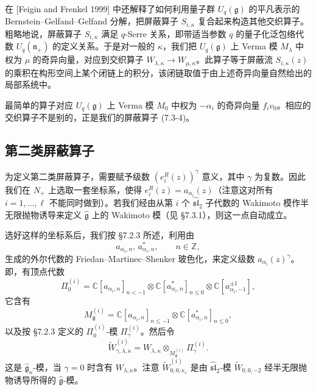 在 [Feigin and Frenkel 1999] 中还解释了如何利用量子群 $U_q(\mathfrak{g})$ 的平凡表示的 Bernstein--Gelfand--Gelfand 分解，把屏蔽算子 $S_{i,\kappa}$ 复合起来构造其他交织算子。粗略地说，屏蔽算子 $S_{i,\kappa}$ 满足 $q$-Serre 关系，即带适当参数 $q$ 的量子化泛包络代数 $U_q(\mathfrak{n}_+)$ 的定义关系。于是对一般的 $\kappa$，我们把 $U_q(\mathfrak{g})$ 上 Verma 模 $M_\lambda$ 中权为 $\mu$ 的奇异向量，对应到交织算子 $W_{\lambda,\kappa}\to W_{\mu,\kappa}$。此算子等于屏蔽流 $S_{i,\kappa}(z)$ 的乘积在构形空间上某个闭链上的积分，该闭链取值于由上述奇异向量自然给出的局部系统中。

最简单的算子对应 $U_q(\mathfrak{g})$ 上 Verma 模 $M_0$ 中权为 $-\alpha_i$ 的奇异向量 $f_iv_0$。相应的交织算子不是别的，正是我们的屏蔽算子 (7.3-4)。


\subsection{第二类屏蔽算子}

为定义第二类屏蔽算子，需要赋予级数 $(e_i^R(z))^\gamma$ 意义，其中 $\gamma$ 为复数。因此我们在 $N_+$ 上选取一套坐标系，使得 $e_i^R(z)=a_{\alpha_i}(z)$（注意这对所有 $i=1,\dots,\ell$ 不能同时做到）。若我们经由从第 $i$ 个 $\widehat{\mathfrak{sl}}_2$ 子代数的 Wakimoto 模作半无限抛物诱导来定义 $\hat{\mathfrak{g}}$ 上的 Wakimoto 模（见 §7.3.1），则这一点自动成立。

选好这样的坐标系后，我们按 §7.2.3 所述，利用由
\[
    a_{\alpha_i,n},\,a_{\alpha_i,n}^*,\qquad n\in\mathbb{Z},
\]
生成的外尔代数的 Friedan--Martinec--Shenker 玻色化，来定义级数 $a_{\alpha_i}(z)^\gamma$。即，有顶点代数
\[
    \Pi_0^{(i)}=\mathbb{C}[a_{\alpha_i,n}]_{n<-1}\otimes\mathbb{C}[a_{\alpha_i,n}^*]_{n\le0}\otimes\mathbb{C}[a_{\alpha_i,-1}^{\pm1}],
\]
它含有
\[
    M_{\mathfrak{g}}^{(i)}=\mathbb{C}[a_{\alpha_i,n}]_{n\le-1}\otimes\mathbb{C}[a_{\alpha_i,n}^*]_{n\le0},
\]
以及按 §7.2.3 定义的 $\Pi_0^{(i)}$-模 $\Pi_\gamma^{(i)}$。然后令
\[
    \widetilde{W}_{\gamma,\lambda,\kappa}^{(i)}=W_{\lambda,\kappa}\otimes_{M_{\mathfrak{g}}^{(i)}}\Pi_\gamma^{(i)}.
\]
这是 $\hat{\mathfrak{g}}_\kappa$-模，当 $\gamma=0$ 时含有 $W_{\lambda,\kappa}$。注意 $\widetilde{W}_{0,0,\kappa_c}^{(i)}$ 是由 $\widehat{\mathfrak{sl}}_2$-模 $\widetilde{W}_{0,0,-2}$ 经半无限抛物诱导所得的 $\hat{\mathfrak{g}}$-模。


